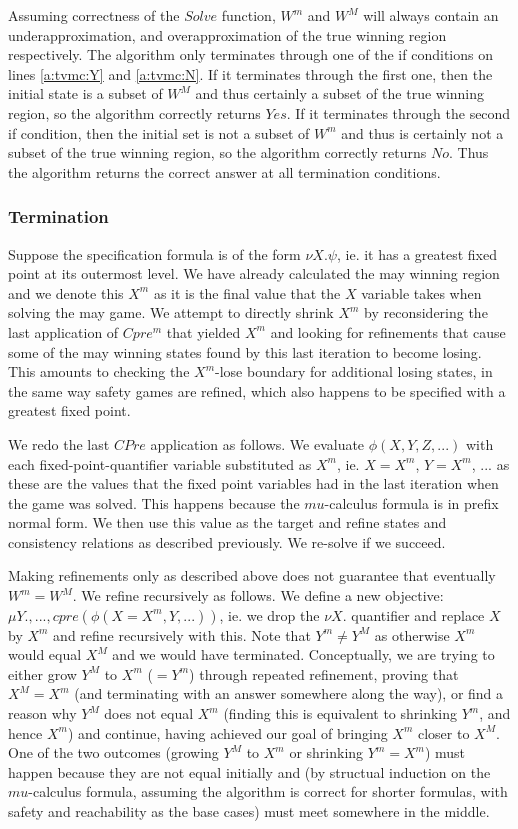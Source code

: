 Assuming correctness of the $Solve$ function, $W^m$ and $W^M$ will always contain an underapproximation, and overapproximation of the true winning region respectively. The algorithm only terminates through one of the if conditions on lines \ref{a:tvmc:Y} and \ref{a:tvmc:N}. If it terminates through the first one, then the initial state is a subset of $W^M$ and thus certainly a subset of the true winning region, so the algorithm correctly returns $Yes$. If it terminates through the second if condition, then the initial set is not a subset of $W^m$ and thus is certainly not a subset of the true winning region, so the algorithm correctly returns $No$. Thus the algorithm returns the correct answer at all termination conditions.

\subsubsection{Termination}

Suppose the specification formula is of the form $\nu X. \psi$, ie. it has a greatest fixed point at its outermost level. We have already calculated the may winning region and we denote this $X^m$ as it is the final value that the $X$ variable takes when solving the may game. We attempt to directly shrink $X^m$ by reconsidering the last application of $Cpre^m$ that yielded $X^m$ and looking for refinements that cause some of the may winning states found by this last iteration to become losing. This amounts to checking the $X^m$-lose boundary for additional losing states, in the same way safety games are refined, which also happens to be specified with a greatest fixed point.

We redo the last $CPre$ application as follows. We evaluate $\phi(X, Y, Z, ...)$ with each fixed-point-quantifier variable substituted as $X^m$, ie. $X=X^m$, $Y=X^m$, ... as these are the values that the fixed point variables had in the last iteration when the game was solved. This happens because the $mu$-calculus formula is in prefix normal form. We then use this value as the target and refine states and consistency relations as described previously. We re-solve if we succeed.

Making refinements only as described above does not guarantee that eventually $W^m = W^M$. We refine recursively as follows. We define a new objective: $\mu Y., ..., cpre(\phi(X=X^m, Y, ...))$, ie. we drop the $\nu X.$ quantifier and replace $X$ by $X^m$ and refine recursively with this. Note that $Y^m \neq Y^M$ as otherwise $X^m$ would equal $X^M$ and we would have terminated. Conceptually, we are trying to either grow $Y^M$ to $X^m$ ($=Y^m$) through repeated refinement, proving that $X^M = X^m$ (and terminating with an answer somewhere along the way), or find a reason why $Y^M$ does not equal $X^m$ (finding this is equivalent to shrinking $Y^m$, and hence $X^m$) and continue, having achieved our goal of bringing $X^m$ closer to $X^M$. One of the two outcomes (growing $Y^M$ to $X^m$ or shrinking $Y^m = X^m$) must happen because they are not equal initially and (by structual induction on the $mu$-calculus formula, assuming the algorithm is correct for shorter formulas, with safety and reachability as the base cases) must meet somewhere in the middle.

